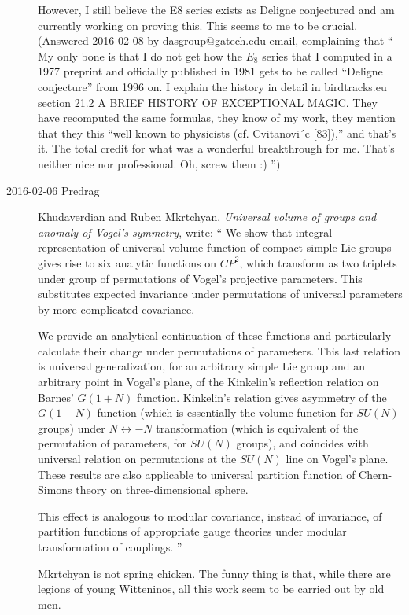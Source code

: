 \begin{description}
However, I still believe the E8 series exists as Deligne conjectured and
am currently working on proving this. This seems to me to be crucial.
\\
(Answered 2016-02-08 by dasgroup@gatech.edu email,
complaining that ``
My only bone is that I do not get how the $E_8$ series that I computed in
a 1977 preprint and officially published in 1981 gets to be called
``Deligne conjecture'' from 1996 on. I explain the history in detail in
birdtracks.eu section 21.2 A BRIEF HISTORY OF EXCEPTIONAL MAGIC. They
have recomputed the same formulas, they know of my work, they mention
that they this ``well known to physicists (cf. Cvitanovi´c [83]),'' and
that's it. The total credit for what was a wonderful breakthrough for me.
That's neither nice nor professional. Oh, screw them :)
'')

\item[2016-02-06  Predrag] Khudaverdian and Ruben Mkrtchyan,
{\em Universal volume of groups and anomaly of {Vogel}'s symmetry},
write: ``
We show that integral representation of universal
volume function of compact simple Lie groups gives rise to six analytic
functions on $CP^2$, which transform as two triplets under group of
permutations of Vogel's projective parameters.  This substitutes
expected invariance under permutations of universal parameters by more
complicated covariance.

 We provide an analytical continuation of these functions and particularly
calculate their change  under  permutations of parameters.  This last
relation is universal generalization, for an arbitrary simple Lie group
and an arbitrary point in Vogel's plane, of the Kinkelin's reflection
relation on Barnes' $G(1+N)$ function. Kinkelin's relation gives asymmetry
of the $G(1+N)$ function (which is essentially the volume function for $SU(N)$
groups)  under $N\leftrightarrow -N$ transformation (which is  equivalent
of the permutation of parameters, for $SU(N)$ groups), and coincides with
universal relation on permutations at the $SU(N)$ line on Vogel's plane.
These results are also applicable to universal partition function of
Chern-Simons theory on three-dimensional sphere.

This effect is  analogous to modular covariance, instead of invariance,
of partition functions of appropriate gauge theories under modular
transformation of couplings.
''

Mkrtchyan is not spring chicken. The funny thing is that, while there are
legions of young Witteninos, all this work seem to be carried out by old
men.


\end{description}
